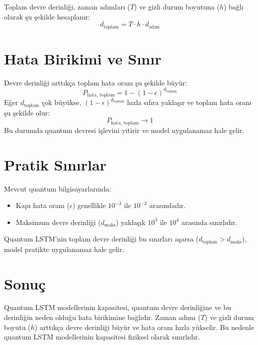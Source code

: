 \documentclass[a4paper,12pt]{article}
\begin{document}
Toplam devre derinliği, zaman adımları ($T$) ve gizli durum boyutuna ($h$) bağlı olarak şu şekilde hesaplanır:
\[
d_{\text{toplam}} = T \cdot h \cdot d_{\text{adım}}
\]

\section*{Hata Birikimi ve Sınır}
Devre derinliği arttıkça toplam hata oranı şu şekilde büyür:
\[
P_{\text{hata, toplam}} = 1 - (1 - \epsilon)^{d_{\text{toplam}}}
\]
Eğer $d_{\text{toplam}}$ çok büyükse, $(1 - \epsilon)^{d_{\text{toplam}}}$ hızla sıfıra yaklaşır ve toplam hata oranı şu şekilde olur:
\[
P_{\text{hata, toplam}} \to 1
\]
Bu durumda quantum devresi işlevini yitirir ve model uygulanamaz hale gelir.

\section*{Pratik Sınırlar}
Mevcut quantum bilgisayarlarında:
\begin{itemize}
    \item Kapı hata oranı ($\epsilon$) genellikle $10^{-3}$ ile $10^{-2}$ arasındadır.
    \item Maksimum devre derinliği ($d_{\text{maks}}$) yaklaşık $10^3$ ile $10^4$ arasında sınırlıdır.
\end{itemize}

Quantum LSTM'nin toplam devre derinliği bu sınırları aşarsa ($d_{\text{toplam}} > d_{\text{maks}}$), model pratikte uygulanamaz hale gelir.

\section*{Sonuç}
Quantum LSTM modellerinin kapasitesi, quantum devre derinliğine ve bu derinliğin neden olduğu hata birikimine bağlıdır. Zaman adımı ($T$) ve gizli durum boyutu ($h$) arttıkça devre derinliği büyür ve hata oranı hızla yükselir. Bu nedenle quantum LSTM modellerinin kapasitesi fiziksel olarak sınırlıdır.
\end{document}
